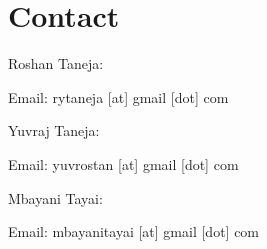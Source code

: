 \documentclass[10pt, twocolumn]{article}
\begin{document}
\nocite{*}

\printbibliography

\section*{Contact}

Roshan Taneja:

Email: rytaneja [at] gmail [dot] com
\\ \newline

Yuvraj Taneja:

Email: yuvrostan [at] gmail [dot] com
\\ \newline

Mbayani Tayai:

Email: mbayanitayai [at] gmail [dot] com
\end{document}
